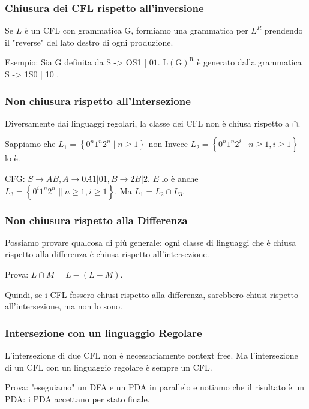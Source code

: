 \subsubsection{Chiusura dei CFL rispetto
all’inversione}

Se $L$ è un CFL con grammatica G, formiamo una grammatica per $L^{R}$ prendendo il "reverse" del lato destro di ogni produzione.

Esempio: Sia G definita da S -> OS1 | $01 .$ $\mathrm{L}(\mathrm{G})^{\mathrm{R}}$ è generato dalla grammatica S -> 1S0 | 10 .

\subsubsection{Non chiusura rispetto
all’Intersezione}

Diversamente dai linguaggi regolari, la
classe dei CFL non è chiusa rispetto a $\cap$.

Sappiamo che $L_{1}=\left\{0^{n} 1^{n} 2^{n} \mid n \geq 1\right\}$ non
Invece $L_{2}=\left\{0^{n} 1^{n} 2^{i} \mid n \geq 1, i \geq 1\right\}$ lo è.

CFG: $S \rightarrow A B, A \rightarrow 0 A 1|01, B \rightarrow 2 B| 2$.
$E$ lo è anche $L_{3}=\left\{0^{i} 1^{n} 2^{n} \| n \geq 1, i \geq 1\right\} .$
Ma $L_{1}=L_{2} \cap L_{3} .$

\subsubsection{Non chiusura rispetto alla
Differenza}

Possiamo provare qualcosa di più generale: ogni classe di linguaggi che è chiusa rispetto alla differenza è chiusa rispetto all'intersezione.

Prova: $L \cap M=L-(L-M)$.

Quindi, se i CFL fossero chiusi rispetto
alla differenza, sarebbero chiusi rispetto all'intersezione, ma non lo sono.

\subsubsection{Intersezione con un
linguaggio Regolare}

L'intersezione di due CFL non è necessariamente context free.
Ma l'intersezione di un CFL con un linguaggio regolare è sempre un CFL.

Prova: "eseguiamo" un DFA e un PDA in parallelo e notiamo che il risultato è un PDA: i PDA accettano per stato finale.

